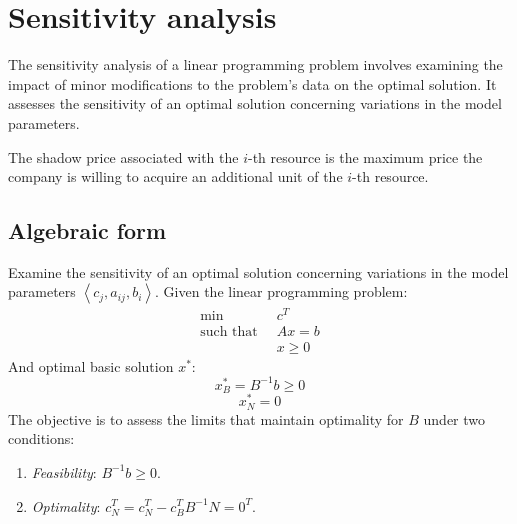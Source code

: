 \section{Sensitivity analysis}

The sensitivity analysis of a linear programming problem involves examining the impact of minor modifications to the problem's data on the optimal solution. 
It assesses the sensitivity of an optimal solution concerning variations in the model parameters.
\begin{definition}
    The shadow price associated with the $i$-th resource is the maximum price the company is willing to acquire an additional unit of the $i$-th resource.
\end{definition}

\subsection{Algebraic form}
Examine the sensitivity of an optimal solution concerning variations in the model parameters $\left\langle c_j, a_{ij}, b_i \right\rangle $.
Given the linear programming problem:
\begin{align*}
    \min                      \:&\: c^T            \\
    \text{such that }     &\: Ax = b         \\
                                &\: x \geq 0
\end{align*}
And optimal basic solution $x^{\ast}$: 
\[x^{\ast}_B=B^{-1}b \geq 0\]
\[x^{\ast}_N=0\]
The objective is to assess the limits that maintain optimality for $B$ under two conditions:
\begin{enumerate}
  \item \textit{Feasibility}: $B^{-1} b \geq 0$.
  \item \textit{Optimality}: $c_N^T = c_N^T - c_B^T B^{-1} N = 0^T$.
\end{enumerate}

